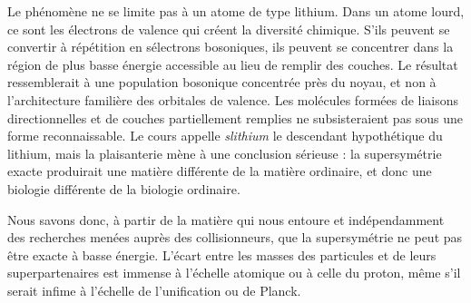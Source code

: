 Le phénomène ne se limite pas à un atome de type lithium. Dans un atome lourd, ce sont les électrons de valence qui créent la diversité chimique. S’ils peuvent se convertir à répétition en sélectrons bosoniques, ils peuvent se concentrer dans la région de plus basse énergie accessible au lieu de remplir des couches. Le résultat ressemblerait à une population bosonique concentrée près du noyau, et non à l’architecture familière des orbitales de valence. Les molécules formées de liaisons directionnelles et de couches partiellement remplies ne subsisteraient pas sous une forme reconnaissable. Le cours appelle \emph{slithium} le descendant hypothétique du lithium, mais la plaisanterie mène à une conclusion sérieuse : la supersymétrie exacte produirait une matière différente de la matière ordinaire, et donc une biologie différente de la biologie ordinaire.

\begin{classroomqa}
\end{classroomqa}

Nous savons donc, à partir de la matière qui nous entoure et indépendamment des recherches menées auprès des collisionneurs, que la supersymétrie ne peut pas être exacte à basse énergie. L’écart entre les masses des particules et de leurs superpartenaires est immense à l’échelle atomique ou à celle du proton, même s’il serait infime à l’échelle de l’unification ou de Planck.

\begin{classroomqa}
\end{classroomqa}

